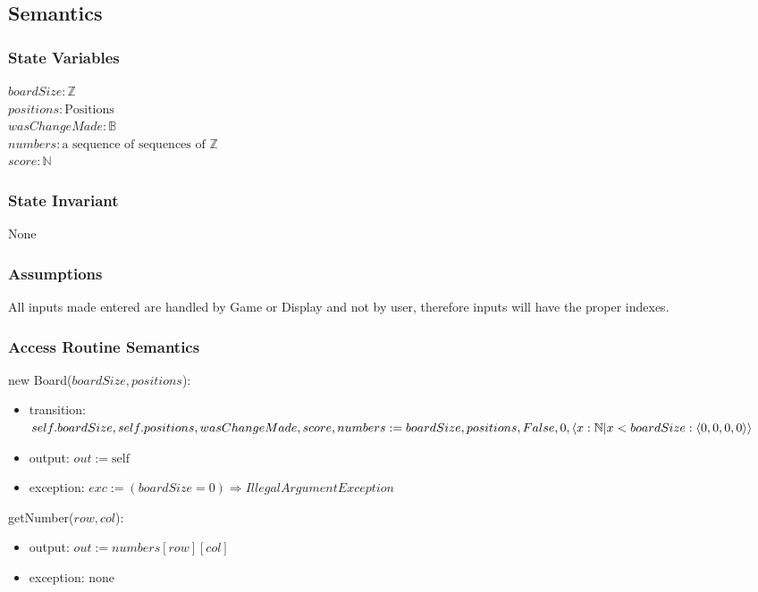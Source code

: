 \documentclass[12pt]{article}
\begin{document}
\subsection* {Semantics}

\subsubsection* {State Variables}

$boardSize: \mathbb{Z}$\\
$positions: \text{Positions}$ \\
$wasChangeMade: \mathbb{B}$ \\
$numbers: \text{a sequence of sequences of }\mathbb{Z}$ \\
$score: \mathbb{N}$

\subsubsection* {State Invariant}

None

\subsubsection* {Assumptions}

All inputs made entered are handled by Game or Display and not by user, therefore inputs will have the proper indexes.

\subsubsection* {Access Routine Semantics}

\noindent new Board($\mathit{boardSize, positions}$):
\begin{itemize}
\item transition: \\
$self.boardSize, self.positions, wasChangeMade, score, numbers := \\
boardSize, positions, False, 0, \langle x : \mathbb{N}|x < boardSize : \langle 0, 0, 0, 0 \rangle \rangle$
\item output: $out := \mbox{self}$
\item exception: $exc := (boardSize = 0) \Rightarrow IllegalArgumentException $
\end{itemize}    


\noindent getNumber($row, col$):
\begin{itemize}
\item output: $out := numbers[row][col]$
\item exception: none
\end{itemize}   
\end{document}
